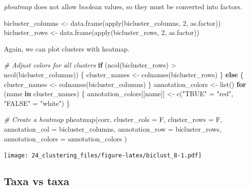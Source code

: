 \documentclass[
]{book}
\newenvironment{Shaded}{\begin{snugshade}}{\end{snugshade}}
\newcommand{\AttributeTok}[1]{\textcolor[rgb]{0.77,0.63,0.00}{#1}}
\newcommand{\CommentTok}[1]{\textcolor[rgb]{0.56,0.35,0.01}{\textit{#1}}}
\newcommand{\ControlFlowTok}[1]{\textcolor[rgb]{0.13,0.29,0.53}{\textbf{#1}}}
\newcommand{\DecValTok}[1]{\textcolor[rgb]{0.00,0.00,0.81}{#1}}
\newcommand{\FunctionTok}[1]{\textcolor[rgb]{0.00,0.00,0.00}{#1}}
\newcommand{\NormalTok}[1]{#1}
\newcommand{\OtherTok}[1]{\textcolor[rgb]{0.56,0.35,0.01}{#1}}
\newcommand{\SpecialCharTok}[1]{\textcolor[rgb]{0.00,0.00,0.00}{#1}}
\newcommand{\StringTok}[1]{\textcolor[rgb]{0.31,0.60,0.02}{#1}}
\begin{document}
\emph{pheatmap} does not allow boolean values, so they must be converted into factors.

\begin{Shaded}
\begin{Highlighting}[]
\NormalTok{bicluster\_columns }\OtherTok{\textless{}{-}} \FunctionTok{data.frame}\NormalTok{(}\FunctionTok{apply}\NormalTok{(bicluster\_columns, }\DecValTok{2}\NormalTok{, as.factor))}
\NormalTok{bicluster\_rows }\OtherTok{\textless{}{-}} \FunctionTok{data.frame}\NormalTok{(}\FunctionTok{apply}\NormalTok{(bicluster\_rows, }\DecValTok{2}\NormalTok{, as.factor))}
\end{Highlighting}
\end{Shaded}

Again, we can plot clusters with heatmap.

\begin{Shaded}
\begin{Highlighting}[]
\CommentTok{\# Adjust colors for all clusters}
\ControlFlowTok{if}\NormalTok{ (}\FunctionTok{ncol}\NormalTok{(bicluster\_rows) }\SpecialCharTok{\textgreater{}} \FunctionTok{ncol}\NormalTok{(bicluster\_columns)) \{}
\NormalTok{  cluster\_names }\OtherTok{\textless{}{-}} \FunctionTok{colnames}\NormalTok{(bicluster\_rows)}
\NormalTok{\} }\ControlFlowTok{else}\NormalTok{ \{}
\NormalTok{  cluster\_names }\OtherTok{\textless{}{-}} \FunctionTok{colnames}\NormalTok{(bicluster\_columns)}
\NormalTok{\}}
\NormalTok{annotation\_colors }\OtherTok{\textless{}{-}} \FunctionTok{list}\NormalTok{()}
\ControlFlowTok{for}\NormalTok{ (name }\ControlFlowTok{in}\NormalTok{ cluster\_names) \{}
\NormalTok{  annotation\_colors[[name]] }\OtherTok{\textless{}{-}} \FunctionTok{c}\NormalTok{(}\StringTok{"TRUE"} \OtherTok{=} \StringTok{"red"}\NormalTok{, }\StringTok{"FALSE"} \OtherTok{=} \StringTok{"white"}\NormalTok{)}
\NormalTok{\}}

\CommentTok{\# Create a heatmap}
\FunctionTok{pheatmap}\NormalTok{(corr,}
  \AttributeTok{cluster\_cols =}\NormalTok{ F, }\AttributeTok{cluster\_rows =}\NormalTok{ F,}
  \AttributeTok{annotation\_col =}\NormalTok{ bicluster\_columns,}
  \AttributeTok{annotation\_row =}\NormalTok{ bicluster\_rows,}
  \AttributeTok{annotation\_colors =}\NormalTok{ annotation\_colors}
\NormalTok{)}
\end{Highlighting}
\end{Shaded}

\texttt{[image: 24\_clustering\_files/figure-latex/biclust\_8-1.pdf]}

\hypertarget{taxa-vs-taxa}{%
\subsection{Taxa vs taxa}\label{taxa-vs-taxa}}
\end{document}
